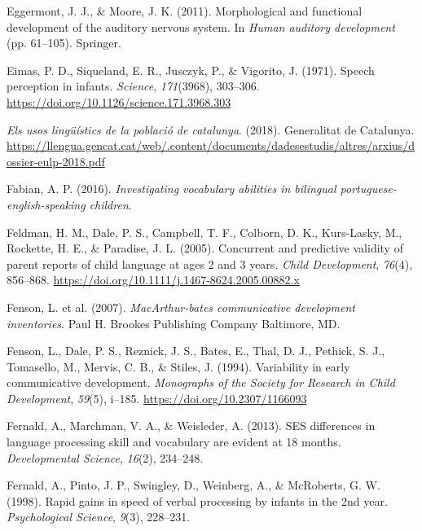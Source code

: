 \documentclass[
  12pt,
  b5paperpaper,
  twoside]{scrreprt}
\newlength{\cslhangindent}
\newlength{\cslentryspacingunit} %
\newenvironment{CSLReferences}[2] %
 {%
  \setlength{\parindent}{0pt}
  \ifodd #1
  \let\oldpar\par
  \def\par{\hangindent=\cslhangindent\oldpar}
  \fi
  \setlength{\parskip}{#2\cslentryspacingunit}
 }%
 {}
\begin{document}
\begin{CSLReferences}{1}{0}
\leavevmode{}%
Eggermont, J. J., \& Moore, J. K. (2011). Morphological and functional
development of the auditory nervous system. In \emph{Human auditory
development} (pp. 61--105). Springer.

\leavevmode{}%
Eimas, P. D., Siqueland, E. R., Jusczyk, P., \& Vigorito, J. (1971).
Speech perception in infants. \emph{Science}, \emph{171}(3968),
303--306. \url{https://doi.org/10.1126/science.171.3968.303}

\leavevmode{}%
\emph{Els usos lingüístics de la població de catalunya}. (2018).
Generalitat de Catalunya.
\url{https://llengua.gencat.cat/web/.content/documents/dadesestudis/altres/arxius/dossier-eulp-2018.pdf}

\leavevmode{}%
Fabian, A. P. (2016). \emph{Investigating vocabulary abilities in
bilingual portuguese-english-speaking children}.

\leavevmode{}%
Feldman, H. M., Dale, P. S., Campbell, T. F., Colborn, D. K.,
Kurs-Lasky, M., Rockette, H. E., \& Paradise, J. L. (2005). Concurrent
and predictive validity of parent reports of child language at ages 2
and 3 years. \emph{Child Development}, \emph{76}(4), 856--868.
\url{https://doi.org/10.1111/j.1467-8624.2005.00882.x}

\leavevmode{}%
Fenson, L. et al. (2007). \emph{{MacArthur}-bates communicative
development inventories}. Paul H. Brookes Publishing Company Baltimore,
{MD}.

\leavevmode{}%
Fenson, L., Dale, P. S., Reznick, J. S., Bates, E., Thal, D. J.,
Pethick, S. J., Tomasello, M., Mervis, C. B., \& Stiles, J. (1994).
Variability in early communicative development. \emph{Monographs of the
Society for Research in Child Development}, \emph{59}(5), i--185.
\url{https://doi.org/10.2307/1166093}

\leavevmode{}%
Fernald, A., Marchman, V. A., \& Weisleder, A. (2013). SES differences
in language processing skill and vocabulary are evident at 18 months.
\emph{Developmental Science}, \emph{16}(2), 234--248.

\leavevmode{}%
Fernald, A., Pinto, J. P., Swingley, D., Weinberg, A., \& McRoberts, G.
W. (1998). Rapid gains in speed of verbal processing by infants in the
2nd year. \emph{Psychological Science}, \emph{9}(3), 228--231.


\end{CSLReferences}
\end{document}
